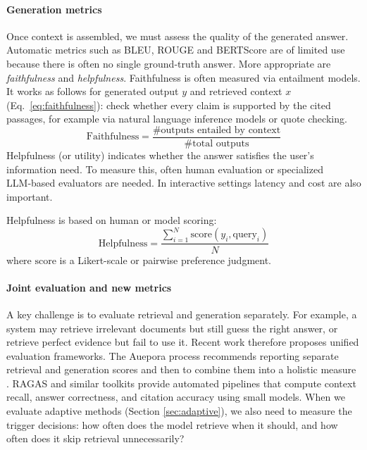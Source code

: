 \paragraph{Generation metrics}  Once context is assembled, we must assess the quality of the generated answer.  Automatic metrics such as BLEU, ROUGE and BERTScore are of limited use because there is often no single ground‑truth answer.  More appropriate are \emph{faithfulness} and \emph{helpfulness}.  Faithfulness is often measured via entailment models. It works as follows for generated output $y$  and retrieved context $x$ (Eq.~\ref{eq:faithfulness}): check whether every claim is supported by the cited passages, for example via natural language inference models or quote checking.  
\begin{equation}
    \mathrm{Faithfulness} = \frac{\text{\# outputs entailed by context}}{\text{\# total outputs}}
    \label{eq:faithfulness}
\end{equation}
Helpfulness (or utility) indicates whether the answer satisfies the user’s information need. To measure this, often human evaluation or specialized LLM‑based evaluators are needed.  In interactive settings latency and cost are also important.

Helpfulness is based on human or model scoring:
\begin{equation}
\mathrm{Helpfulness} = \frac{\sum_{i=1}^N \text{score}(y_i, \text{query}_i)}{N}
\label{eq:helpfullness}
\end{equation}
where $\text{score}$ is a Likert-scale or pairwise preference judgment.


\paragraph{Joint evaluation and new metrics}  A key challenge is to evaluate  retrieval and generation separately.  For example, a system may retrieve irrelevant documents but still guess the right answer, or retrieve perfect evidence but fail to use it.  Recent work therefore proposes unified evaluation frameworks.  The Auepora process %
recommends reporting separate retrieval and generation scores and then to combine them into a holistic measure \citep{yu2024rag_eval}.  RAGAS and similar toolkits provide automated pipelines that compute context recall, answer correctness, and citation accuracy using small models.  When we evaluate adaptive methods (Section \ref{sec:adaptive}), we also need to measure the trigger decisions: how often does the model retrieve when it should, and how often does it skip retrieval unnecessarily?

